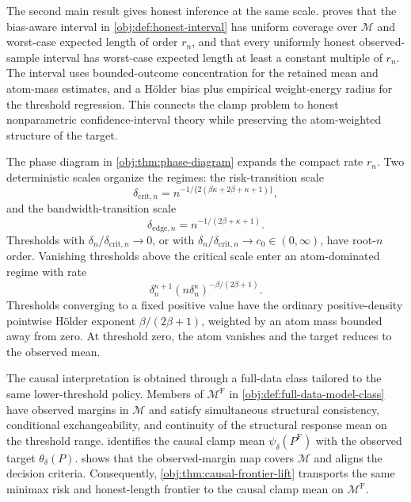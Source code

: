 \documentclass[11pt]{article}
\begin{document}
The second main result gives honest inference at the same scale.  proves that the bias-aware interval in \cref{obj:def:honest-interval} has uniform coverage over \(\mathcal M\) and worst-case expected length of order \(r_n\), and that every uniformly honest observed-sample interval has worst-case expected length at least a constant multiple of \(r_n\). The interval uses bounded-outcome concentration for the retained mean and atom-mass estimates, and a Hölder bias plus empirical weight-energy radius for the threshold regression. This connects the clamp problem to honest nonparametric confidence-interval theory \citep{Low1997NonparametricConfidenceIntervals,ArmstrongKolesar2018OptimalInference,ArmstrongKolesar2020} while preserving the atom-weighted structure of the target.

The phase diagram in \cref{obj:thm:phase-diagram} expands the compact rate \(r_n\). Two deterministic scales organize the regimes: the risk-transition scale
\[
\delta_{\mathrm{crit},n}
=
n^{-1/\{2(\beta\kappa+2\beta+\kappa+1)\}},
\]
and the bandwidth-transition scale
\[
\delta_{\mathrm{edge},n}
=
n^{-1/(2\beta+\kappa+1)}.
\]
Thresholds with \(\delta_n/\delta_{\mathrm{crit},n}\to0\), or with \(\delta_n/\delta_{\mathrm{crit},n}\to c_0\in(0,\infty)\), have root-\(n\) order. Vanishing thresholds above the critical scale enter an atom-dominated regime with rate
\[
\delta_n^{\kappa+1}(n\delta_n^\kappa)^{-\beta/(2\beta+1)}.
\]
Thresholds converging to a fixed positive value have the ordinary positive-density pointwise Hölder exponent \(\beta/(2\beta+1)\), weighted by an atom mass bounded away from zero. At threshold zero, the atom vanishes and the target reduces to the observed mean.

The causal interpretation is obtained through a full-data class tailored to the same lower-threshold policy. Members of \(\mathcal M^{\mathrm F}\) in \cref{obj:def:full-data-model-class} have observed margins in \(\mathcal M\) and satisfy simultaneous structural consistency, conditional exchangeability, and continuity of the structural response mean on the threshold range.  identifies the causal clamp mean \(\psi_\delta(P^{\mathrm F})\) with the observed target \(\theta_\delta(P)\).  shows that the observed-margin map covers \(\mathcal M\) and aligns the decision criteria. Consequently, \cref{obj:thm:causal-frontier-lift} transports the same minimax risk and honest-length frontier to the causal clamp mean on \(\mathcal M^{\mathrm F}\).
\end{document}
